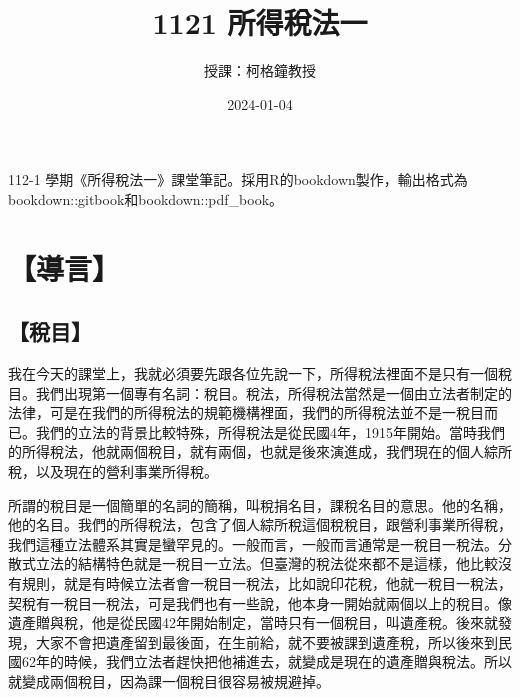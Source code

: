 \documentclass[oneside,sub3section]{ctexbook}
\title{1121 所得稅法一}
\author{授課：柯格鐘教授}
\date{2024-01-04}
\begin{document}
\maketitle

\thispagestyle{empty}

\mbox{}
\vspace{10cm}
\begin{center}

    112-1 學期《所得稅法一》課堂筆記。採用R的bookdown製作，輸出格式為bookdown::gitbook和bookdown::pdf\_book。
    
\end{center}

\setlength{\abovedisplayskip}{-5pt}
\setlength{\abovedisplayshortskip}{-5pt}



{
\setcounter{tocdepth}{3}
\tableofcontents
}



\mainmatter

\hypertarget{ux5c0eux8a00}{%
\chapter{【導言】}\label{ux5c0eux8a00}}

\hypertarget{ux7a05ux76ee}{%
\section{【稅目】}\label{ux7a05ux76ee}}

我在今天的課堂上，我就必須要先跟各位先說一下，所得稅法裡面不是只有一個稅目。我們出現第一個專有名詞：稅目。稅法，所得稅法當然是一個由立法者制定的法律，可是在我們的所得稅法的規範機構裡面，我們的所得稅法並不是一稅目而已。我們的立法的背景比較特殊，所得稅法是從民國4年，1915年開始。當時我們的所得稅法，他就兩個稅目，就有兩個，也就是後來演進成，我們現在的個人綜所稅，以及現在的營利事業所得稅。

所謂的稅目是一個簡單的名詞的簡稱，叫稅捐名目，課稅名目的意思。他的名稱，他的名目。我們的所得稅法，包含了個人綜所稅這個稅稅目，跟營利事業所得稅，我們這種立法體系其實是蠻罕見的。一般而言，一般而言通常是一稅目一稅法。分散式立法的結構特色就是一稅目一立法。但臺灣的稅法從來都不是這樣，他比較沒有規則，就是有時候立法者會一稅目一稅法，比如說印花稅，他就一稅目一稅法，契稅有一稅目一稅法，可是我們也有一些說，他本身一開始就兩個以上的稅目。像遺產贈與稅，他是從民國42年開始制定，當時只有一個稅目，叫遺產稅。後來就發現，大家不會把遺產留到最後面，在生前給，就不要被課到遺產稅，所以後來到民國62年的時候，我們立法者趕快把他補進去，就變成是現在的遺產贈與稅法。所以就變成兩個稅目，因為課一個稅目很容易被規避掉。
\end{document}
